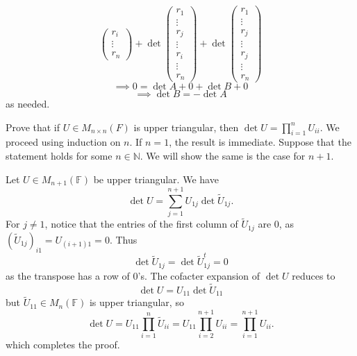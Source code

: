 \documentclass{eh-homework}
\begin{document}
\begin{question}{4}
\[\begin{pmatrix}
            r_i \\
            \vdots \\
            r_n
        \end{pmatrix}+
        \det \begin{pmatrix}
            r_1 \\
            \vdots \\
            r_j\\
            \vdots \\
            r_i \\
            \vdots \\
            r_n
       \end{pmatrix}+
       \det \begin{pmatrix}
            r_1 \\
            \vdots \\
            r_j\\
            \vdots \\
            r_j \\
            \vdots \\
            r_n
        \end{pmatrix}
    \]
    \[
        \implies 0 = \det A + 0 + \det B + 0
    \]
    \[
        \implies \det B = -\det A
    \]
    as needed.
    \end{question}
    \newpage
    \begin{question}{5}
    Prove that if $U \in M_{n \times n}(F)$ is upper triangular, then $\det U = \prod_{i=1}^n U_{ii}$.
    \tcblower
    We proceed using induction on \(n\). If \(n=1\), the result is immediate. Suppose that the statement holds for some \(n \in \mathbb{N}\). We will show the same is the case for \(n + 1\).

    Let \(U \in M_{n+1} (\mathbb{F})\) be upper triangular. We have
    \[
        \det U = \sum_{j=1}^{n+1} U_{1j} \det \tilde{U}_{1j}.
    \]
    For \(j \neq 1\), notice that the entries of the first column of \(\tilde{U}_{1j}\) are 0, as \((\tilde{U}_{1j})_{i1} = U_{(i+1)1} = 0\). Thus
    \[
        \det \tilde{U}_{1j} = \det \tilde{U}_{1j}^t = 0
    \]
    as the transpose has a row of 0's. The cofacter expansion of \(\det U\) reduces to
    \[
        \det U = U_{11} \det \tilde{U}_{11}
    \]
    but \(\tilde{U}_{11} \in M_n(\mathbb{F})\) is upper triangular, so
    \[
        \det U = U_{11} \prod _{i=1}^n \tilde{U}_{ii} = U_{11} \prod _{i=2}^{n+1} U_{ii} = \prod _{i=1}^{n+1} U_{ii}. 
    \]
    which completes the proof.
    \end{question}
\end{document}
